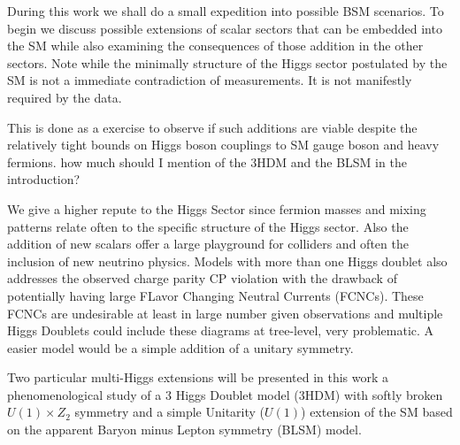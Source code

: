 During this work we shall do a small expedition into possible BSM scenarios. To begin we discuss possible extensions of scalar sectors that can be embedded into the SM while also examining the consequences of those addition in the other sectors. Note while the minimally structure of the Higgs sector postulated by the SM is not a immediate contradiction of measurements. It is not manifestly required by the data. 

This is done as a exercise to observe if such additions are viable despite the relatively tight bounds on Higgs boson couplings to SM gauge boson and heavy fermions. {\color{blue} how much should I mention of the 3HDM and the BLSM in the introduction?}

We give a higher repute to the Higgs Sector since fermion masses and mixing patterns relate often to the specific structure of the Higgs sector. Also the addition of new scalars offer a large playground for colliders and often the inclusion of new neutrino physics. Models with more than one Higgs doublet also addresses the observed charge parity CP violation with the drawback of potentially having large FLavor Changing Neutral Currents (FCNCs). These FCNCs are undesirable at least in large number given observations and multiple Higgs Doublets could include these diagrams at tree-level, very problematic. A easier model would be a simple addition of a unitary symmetry.

Two particular multi-Higgs extensions will be presented in this work a phenomenological study of a 3 Higgs Doublet model (3HDM) with softly broken $U(1) \times Z_2$ symmetry and a simple Unitarity ($U(1)$) extension of the SM based on the apparent Baryon minus Lepton symmetry (BLSM) model.

